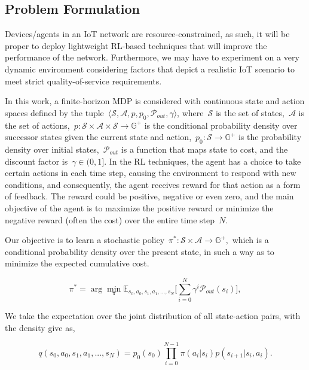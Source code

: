 \documentclass[journal]{IEEEtran}
\begin{document}
\subsection{Problem Formulation}

Devices/agents in an IoT network are resource-constrained, as such, it will be proper to deploy lightweight RL-based techniques that will improve the performance of the network. Furthermore, we may have to experiment on a very dynamic environment considering factors that depict a realistic IoT scenario to meet strict quality-of-service requirements.

In this work, a finite-horizon MDP is considered with continuous state and action spaces defined by the tuple~$\langle \mathcal{S}, \mathcal{A}, p, p_0, \mathcal{P}_{out}, \gamma \rangle$, where~$\mathcal{S}$ is the set of states,~$\mathcal{A}$ is the set of actions,~$p: \mathcal{S}\times \mathcal{A} \times \mathcal{S} \rightarrow \mathbb{G}^+$ is the conditional probability density over successor states given the current state and action,~$p_0: \mathcal{S} \rightarrow \mathbb{G}^+ $ is the probability density over initial states,~$\mathcal{P}_{out}$ is a function that maps state to cost, and the discount factor is~$\gamma \in (0,1]$.
In the RL techniques, the agent has a choice to take certain actions in each time step, causing the environment to respond with new conditions, and consequently, the agent receives reward for that action as a form of feedback. The reward could be positive, negative or even zero, and the main objective of the agent is to maximize the positive reward or minimize the negative reward (often the cost) over the entire time step~$N$.

Our objective is to learn a stochastic policy~$\pi^*: \mathcal{S}\times \mathcal{A}\rightarrow \mathbb{G}^+,$ which is a conditional probability density over the present state, in such a way as to minimize the expected cumulative cost.


\begin{equation}\label{eqn4}
\pi^* = \arg \min_{\pi} \mathbb{E}_{s_0, a_0, s_1, a_1, ..., s_N} \Big[ \sum_{i=0}^{N} \gamma^i \mathcal{P}_{out}(s_i) \Big],
\end{equation}

We take the expectation over the joint distribution of all state-action pairs, with the density give as,

\begin{equation}\label{eqn5}
q(s_0, a_0, s_1, a_1, ..., s_N) = p_0(s_0) \prod_{i=0}^{N-1} \pi(a_i|s_i) p(s_{i+1}|s_i, a_i).
\end{equation}
\end{document}
